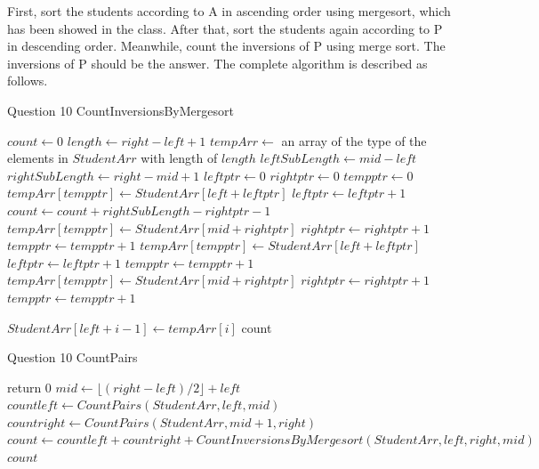\documentclass[10.5pt]{article}
\begin{document}
First, sort the students according to A in ascending order using mergesort, which has been showed in the class. After that, sort the students again according to P in descending order. Meanwhile, count the inversions of P using merge sort. The inversions of P should be the answer. The complete algorithm is described as follows.\\
\begin{algorithm}[H]
	\caption{Question 10 CountInversionsByMergesort}
	\begin{algorithmic}[1]
		\State $count \gets 0$
		\State $length \gets right - left + 1$
		\State $tempArr \gets$ an array of the type of the elements in $StudentArr$ with length of $length$
		\State $leftSubLength \gets mid - left$
		\State $rightSubLength \gets right - mid + 1$
		\State $leftptr \gets 0$
		\State $rightptr \gets 0$
		\State $tempptr \gets 0$
				\State $tempArr[tempptr] \gets StudentArr[left + leftptr]$
				\State $leftptr \gets leftptr + 1$
				\State $count \gets count + rightSubLength - rightptr - 1$
			\Else
				\State $tempArr[tempptr] \gets StudentArr[mid + rightptr]$
				\State $rightptr \gets rightptr + 1$
			\EndIf
			\State $tempptr \gets tempptr + 1$
		\EndWhile
			\State $tempArr[tempptr] \gets StudentArr[left + leftptr]$
			\State $leftptr \gets leftptr + 1$
			\State $tempptr \gets tempptr + 1$
		\EndWhile
			\State $tempArr[tempptr] \gets StudentArr[mid + rightptr]$
			\State $rightptr \gets rightptr + 1$
			\State $tempptr \gets tempptr + 1$
		\EndWhile
	\end{algorithmic}	
\end{algorithm}

\begin{algorithm} [H]
	\begin{algorithmic}[1]
			\State $StudentArr[left + i - 1] \gets tempArr[i]$
		\EndFor
		\State \Return count
		\EndFunction
	\end{algorithmic}	
\end{algorithm}

\begin{algorithm} [H]
	\caption{Question 10 CountPairs}
	\begin{algorithmic}[1]
			\State return 0
		\EndIf
		\State $mid \gets \lfloor (right - left )/ 2 \rfloor+ left$
		\State $countleft \gets CountPairs(StudentArr, left, mid)$
		\State $countright \gets CountPairs(StudentArr, mid + 1, right)$
		\State $count \gets countleft + countright + CountInversionsByMergesort(StudentArr, left, right, mid)$
		\State \Return $count$
		\EndFunction
	\end{algorithmic}
\end{algorithm}
\end{document}

